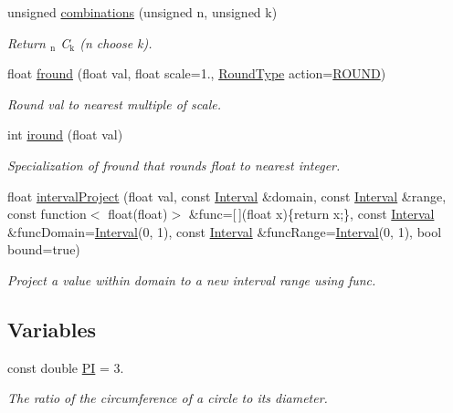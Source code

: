 \begin{DoxyCompactItemize}
unsigned \hyperlink{namespacekmath_a53519d2ec30d9df038dbe8ceaead1a9c}{combinations} (unsigned n, unsigned k)
\begin{DoxyCompactList}\small\item\em Return $_{\mbox{n}}$ C$_{\mbox{k}}$  (n choose k). \end{DoxyCompactList}\item 
float \hyperlink{namespacekmath_aa18b5fc52315b0ca7717a52bdf152ee6}{fround} (float val, float scale=1., \hyperlink{namespacekmath_a1e00ae34fe8ed9548870fc759ea82609}{Round\-Type} action=\hyperlink{namespacekmath_a1e00ae34fe8ed9548870fc759ea82609ae04658d947a7879a4502f837c286f1ac}{R\-O\-U\-N\-D})
\begin{DoxyCompactList}\small\item\em Round val to nearest multiple of scale. \end{DoxyCompactList}\item 
int \hyperlink{namespacekmath_a32d7d4c091092ac7e21d7beb15daaf1a}{iround} (float val)
\begin{DoxyCompactList}\small\item\em Specialization of {\ttfamily fround} that rounds float to nearest integer. \end{DoxyCompactList}\item 
float \hyperlink{namespacekmath_a1792feb5272baa371047829dc4a30264}{interval\-Project} (float val, const \hyperlink{structkmath_1_1_interval}{Interval} \&domain, const \hyperlink{structkmath_1_1_interval}{Interval} \&range, const function$<$ float(float)$>$ \&func=\mbox{[}$\,$\mbox{]}(float x)\{return x;\}, const \hyperlink{structkmath_1_1_interval}{Interval} \&func\-Domain=\hyperlink{structkmath_1_1_interval}{Interval}(0, 1), const \hyperlink{structkmath_1_1_interval}{Interval} \&func\-Range=\hyperlink{structkmath_1_1_interval}{Interval}(0, 1), bool bound=true)
\begin{DoxyCompactList}\small\item\em Project a value within {\ttfamily domain} to a new interval {\ttfamily range} using {\ttfamily func}. \end{DoxyCompactList}\end{DoxyCompactItemize}
\subsection*{Variables}
\begin{DoxyCompactItemize}
\item 
const double \hyperlink{namespacekmath_a1224c45abb03af2a5136e24f09d9b4c3}{P\-I} = 3.
\begin{DoxyCompactList}\small\item\em The ratio of the circumference of a circle to its diameter. \end{DoxyCompactList}\end{DoxyCompactItemize}


